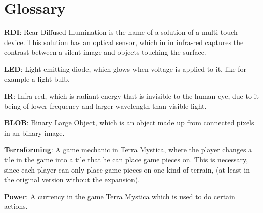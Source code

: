 \chapter*{Glossary}\label{gloss}

\textbf{RDI}: Rear Diffused Illumination is the name of a solution of a multi-touch device\citep{multiTT}. This solution has an optical sensor, which in in infra-red captures the contrast between a silent image and objects touching the surface.

\textbf{LED}: Light-emitting diode, which glows when voltage is applied to it, like for example a light bulb.

\textbf{IR}: Infra-red, which is radiant energy that is invisible to the human eye, due to it being of lower frequency and larger wavelength than visible light.

\textbf{BLOB}: Binary Large Object, which is an object made up from connected pixels in an binary image. 

\textbf{Terraforming}: A game mechanic in Terra Mystica, where the player changes a tile in the game into a tile that he can place game pieces on. This is necessary, since each player can only place game pieces on one kind of terrain, (at least in the original version without the expansion).

\textbf{Power}: A currency in the game Terra Mystica which is used to do certain actions.